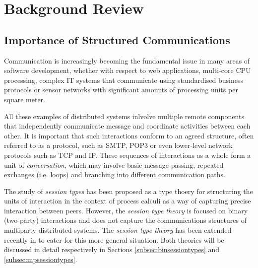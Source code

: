 
\chapter{Background Review}
\label{ch:background}


\section{Importance of Structured Communications}
\label{sec:structuredcommms}

Communication is increasingly becoming the fundamental issue in many areas of software development, whether with respect to web applications, multi-core CPU processing, complex IT systems that communicate using standardised business protocols or sensor networks with significant amounts of processing units per square meter\cite{sessionbased_programming}.

All these examples of distributed systems inlvolve multiple remote components that independently communicate message and coordinate activities between each other. It is important that such interactions conform to an agreed structure, often referred to as a protocol, such as SMTP, POP3\cite{sess_type_guided_distr_interact} or even lower-level network protocols such as TCP and IP. These sequences of interactions as a whole form a unit of \textit{conversation}, which may involve basic message passing, repeated exchanges (i.e. loops) and branching into different communication paths\cite{sessionbased_programming}.

The study of \textit{session types} has been proposed as a type thoery for structuring the units of interaction in the context of process calculi as a way of capturing precise interaction between peers\cite{sessionbased_programming, sess_type_guided_distr_interact}. However, the \textit{session type theory} is focused on binary (two-party) interactions and does not capture the communications structures of multiparty distributed systems. The \textit{session type theory} has been extended recently in \cite{multiparty_sess_types} to cater for this more general situation. Both theories will be discussed in detail respectively in Sections \ref{subsec:binsessiontypes} and \ref{subsec:mpsessiontypes}.



